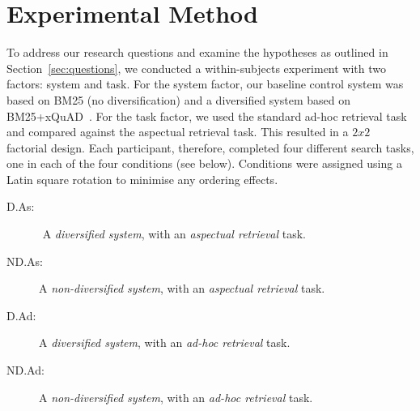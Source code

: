 \section{Experimental Method} \label{sec:method}
To address our research questions and examine the hypotheses as outlined in Section~\ref{sec:questions}, we conducted a within-subjects experiment with two factors: system and task. For the system factor, our baseline control system was based on BM25 (no diversification) and a diversified system based on BM25+xQuAD~\cite{santos2010query_reformulations_diversification}. For the task factor, we used the standard ad-hoc retrieval task and compared against the aspectual retrieval task. This resulted in a $2x2$ factorial design. Each participant, therefore, completed four different search tasks, one in each of the four conditions (see below). Conditions were assigned using a Latin square rotation to minimise any ordering effects.


\begin{description}
\item[D.As: $ $ ] $ $ A \emph{diversified system}, with an \emph{aspectual retrieval} task.
\item[ND.As:] A \emph{non-diversified system}, with an \emph{aspectual retrieval} task.
\item[D.Ad: $ $ ] A \emph{diversified system}, with an \emph{ad-hoc retrieval} task. 
\item[ND.Ad:] A \emph{non-diversified system}, with an \emph{ad-hoc retrieval} task.
\end{description}


